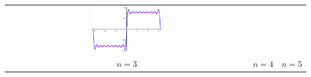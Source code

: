 \begin{center}
\begin{tabular}{ccc}
		\includegraphics[width=0.3\textwidth]{./images/ch13/fsgn/f5.pdf} \\
		$n=3$ & $n=4$ & $n=5$
	\end{tabular}
% 	
% 	
\end{center}

